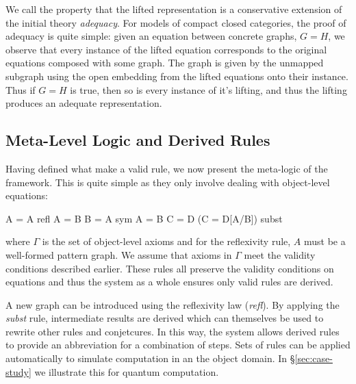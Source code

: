 \documentclass[runningheads]{llncs}
\begin{document}
We call the property that the lifted representation is a conservative
extension of the initial theory \emph{adequacy}. For models of compact
closed categories, the proof of adequacy is quite simple: given an
equation between concrete graphs, $G = H$, we observe that every
instance of the lifted equation corresponds to the original equations
composed with some graph. The graph is given by the unmapped subgraph
using the open embedding from the lifted equations onto their
instance. Thus if $G = H$ is true, then so is every instance of it's
lifting, and thus the lifting produces an adequate representation.

\subsection{Meta-Level Logic and Derived Rules}

Having defined what make a valid rule, we now present the meta-logic
of the framework. This is quite simple as they only involve dealing
with object-level equations:

\begin{center}
\prooftree
\justifies
\Gamma \vdash A = A
\using\mbox{refl}
\endprooftree 
\quad\quad
\prooftree
\Gamma \vdash A = B
\justifies
\Gamma \vdash B = A
\using\mbox{sym}
\endprooftree
\quad\quad
\prooftree
\Gamma \vdash A = B \quad\quad
\Gamma \vdash C = D
\justifies
\Gamma \vdash (C = D[A/B])
\using\mbox{subst}
\endprooftree
\end{center}

\noindent where $\Gamma$ is the set of object-level axioms and for the
reflexivity rule, $A$ must be a well-formed pattern graph. We assume
that axioms in $\Gamma$ meet the validity conditions described
earlier. These rules all preserve the validity conditions on equations
and thus the system as a whole ensures only valid rules are derived.

A new graph can be introduced using the reflexivity law (\emph{refl}).
By applying the \emph{subst} rule, intermediate results are derived
which can themselves be used to rewrite other rules and conjetcures.
In this way, the system allows derived rules to provide an
abbreviation for a combination of steps. Sets of rules can be applied
automatically to simulate computation in an the object domain. In
\S\ref{sec:case-study} we illustrate this for quantum computation.
\end{document}

